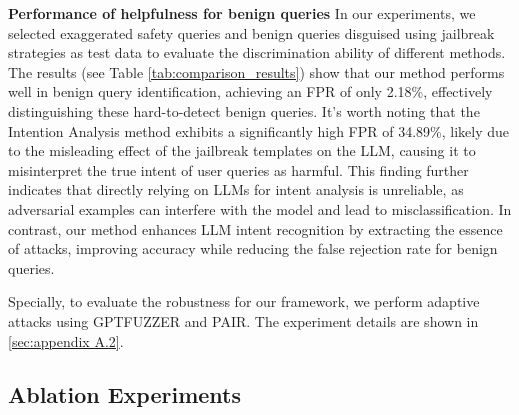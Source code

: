 \noindent \textbf{Performance of helpfulness for benign queries} In our experiments, we selected exaggerated safety queries and benign queries disguised using jailbreak strategies as test data to evaluate the discrimination ability of different methods.
The results (see Table \ref{tab:comparison_results}) show that our method performs well in benign query identification, achieving an FPR of only 2.18\%, effectively distinguishing these hard-to-detect benign queries. It's worth noting that the Intention Analysis method exhibits a significantly high FPR of 34.89\%, likely due to the misleading effect of the jailbreak templates on the LLM, causing it to misinterpret the true intent of user queries as harmful.
This finding further indicates that directly relying on LLMs for intent analysis is unreliable, as adversarial examples can interfere with the model and lead to misclassification. In contrast, our method enhances LLM intent recognition by extracting the essence of attacks, improving accuracy while reducing the false rejection rate for benign queries.

Specially, to evaluate the robustness for our framework, we perform adaptive attacks using GPTFUZZER and PAIR. The experiment details are shown in \ref{sec:appendix A.2}.


\subsection{Ablation Experiments}
